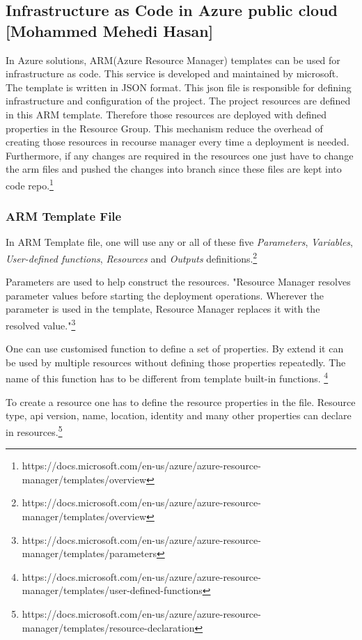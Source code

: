 \subsection{Infrastructure as Code in Azure public cloud [Mohammed Mehedi Hasan]}
In Azure solutions, ARM(Azure Resource Manager) templates can be used for infrastructure as code. This service is developed and maintained by microsoft. The template is written in JSON format. This json file is responsible for defining infrastructure and configuration of the project. The project resources are defined in this ARM template. Therefore those resources are deployed with defined properties in the Resource Group. This mechanism reduce the overhead of creating those resources in recourse manager every time a deployment is needed. Furthermore, if any changes are required in the resources one just have to change the arm files and pushed the changes into branch since these files are kept into code repo.\footnote{https://docs.microsoft.com/en-us/azure/azure-resource-manager/templates/overview}

\subsubsection{ARM Template File}

In ARM Template file, one will use any or all of these five \textit{Parameters}, \textit{Variables}, \textit{User-defined functions}, \textit{Resources} and \textit{Outputs} definitions.\footnote{https://docs.microsoft.com/en-us/azure/azure-resource-manager/templates/overview}

Parameters are used to help construct the resources. "Resource Manager resolves parameter values before starting the deployment operations. Wherever the parameter is used in the template, Resource Manager replaces it with the resolved value."\footnote{https://docs.microsoft.com/en-us/azure/azure-resource-manager/templates/parameters}

One can use customised function to define a set of properties. By extend it can be used by multiple resources without defining those properties repeatedly. The name of this function has to be different from template built-in functions. \footnote{https://docs.microsoft.com/en-us/azure/azure-resource-manager/templates/user-defined-functions}

To create a resource one has to define the resource properties in the file. Resource type, api version, name, location, identity and many other properties can declare in resources.\footnote{https://docs.microsoft.com/en-us/azure/azure-resource-manager/templates/resource-declaration}

